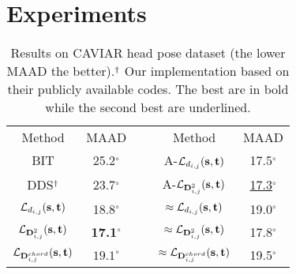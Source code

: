 \section{Experiments}


\begin{table}[t]  
\scriptsize
\renewcommand\arraystretch{1.2}
\label{tab:different_nets}
\begin{center}
\begin{tabular}{|c|c|c|c|c|}
\cline{1-2}\cline{4-5}


{Method}&MAAD&\scriptsize{~}&{Method}&MAAD\\\cline{1-2}\cline{4-5}


BIT\cite{beyer2015biternion}&25.2$^{\circ}$&\scriptsize{~}&A-${\mathcal{L}_{d_{i,j}}}{(\rm{{\textbf{s},{\textbf{t}}}})}$&17.5$^{\circ}$\\\cline{1-2}\cline{4-5}



DDS\cite{prokudin2018deep}$^\text{\dag}$&23.7$^{\circ}$&\scriptsize{~}&A-${\mathcal{L}_{{\rm\textbf{D}}_{i,j}^2}}{(\rm{{\textbf{s},{\textbf{t}}}})}$&\underline{17.3}$^{\circ}$\\\cline{1-2}\cline{4-5}

    
$\mathcal{L}_{d_{i,j}}(\rm{\textbf{s},{\textbf{t}}})$&18.8$^{\circ}$&\scriptsize{~}& $\approx\mathcal{L}_{d_{i,j}}(\rm{\textbf{s},{\textbf{t}}})$&19.0$^{\circ}$\\\cline{1-2}\cline{4-5}


$\mathcal{L}_{{\rm\textbf{D}}_{i,j}^2}{(\rm{{\textbf{s},{\textbf{t}}}})}$&\textbf{17.1}$^{\circ}$&\scriptsize{~}&$\approx\mathcal{L}_{{\rm\textbf{D}}_{i,j}^2}{(\rm{{\textbf{s},{\textbf{t}}}})}$&17.8$^{\circ}$\\\cline{1-2}\cline{4-5}

$\mathcal{L}_{{\rm\textbf{D}}_{i,j}^{chord}}{(\rm{{\textbf{s},{\textbf{t}}}})}$&$19.1^{\circ}$&\scriptsize{~}&$\approx\mathcal{L}_{{\rm\textbf{D}}_{i,j}^{chord}}{(\rm{{\textbf{s},{\textbf{t}}}})}$&19.5$^{\circ}$\\\cline{1-2}\cline{4-5}



\end{tabular}\label{con:1}
\end{center}
\caption{Results on CAVIAR head pose dataset (the lower MAAD the better).$^\text{\dag}$ Our implementation based on their publicly available codes. The best are in bold while the second best are underlined.}
\end{table}



